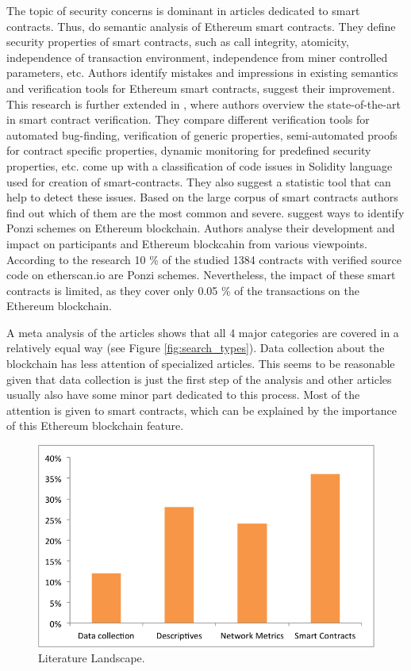 The topic of security concerns is dominant in articles dedicated to smart contracts. 
Thus, \cite{grishchenko2018semantic} do semantic analysis of Ethereum smart contracts. 
They define security properties of smart contracts, such as call integrity, atomicity, independence of transaction environment, independence from miner controlled parameters, etc.
Authors identify mistakes and impressions in existing semantics and verification tools for Ethereum smart contracts, suggest their improvement.
This research is further extended in \cite{grishchenko2018foundations}, where authors overview the state-of-the-art in smart contract verification.
They compare different verification tools for automated bug-finding, verification of generic properties, semi-automated proofs for contract specific properties, dynamic monitoring for predefined security properties, etc.
\cite{tikhomirov2018smartcheck} come up with a classification of code issues in Solidity language used for creation of smart-contracts. 
They also suggest a statistic tool that can help to detect these issues.
Based on the large corpus of smart contracts authors find out which of them are the most common and severe.
\cite{bartoletti2017dissecting} suggest ways to identify Ponzi schemes on Ethereum blockchain. 
Authors analyse their development and impact on participants and Ethereum blockcahin from various viewpoints. 
According to the research 10 \% of the studied 1384 contracts with verified source code
on etherscan.io are Ponzi schemes. 
Nevertheless, the impact of these smart contracts is limited, as they cover only 0.05 \% of the transactions on the Ethereum blockchain.


A meta analysis of the articles shows that all 4 major categories are covered in a relatively equal way (see Figure \ref{fig:search_types}).
Data collection about the blockchain has less attention of specialized articles.
This seems to be reasonable given that data collection is just the first step of the analysis and other articles usually also have some minor part dedicated to this process.
Most of the attention is given to smart contracts, which can be explained by the importance of this Ethereum blockchain feature.

\begin{figure}[h]
  \centering
  \includegraphics[width=\linewidth]{figures/literature.png}
  \caption{Literature Landscape.}
  \label{fig:literature}
\end{figure}

